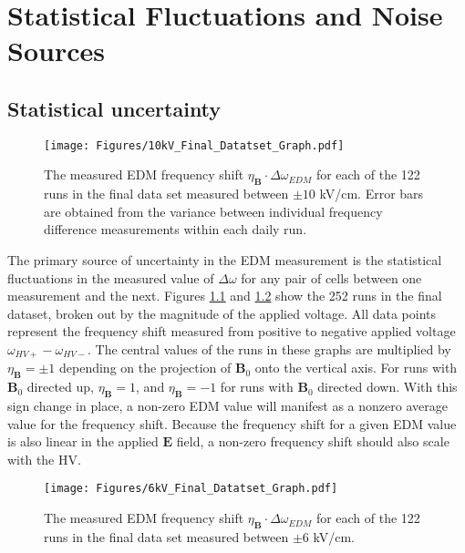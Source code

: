 \documentclass [10pt, twoside] {uwthesis}[2012/04/02]
\begin{document}
\chapter{Statistical Fluctuations and Noise Sources}
\section{Statistical uncertainty}
\begin{figure}[t] \label{10kV_final_result_graph}
\begin{center}
\texttt{[image: Figures/10kV\_Final\_Datatset\_Graph.pdf]}
\end{center}
\caption[Final EDM data set, $\pm$10 kV runs]
{\narrower The measured EDM frequency shift $\eta_{\mathbf{B}}\cdot\Delta \omega_{EDM}$ for each of the 122 runs in the final data set measured between $\pm 10$ kV/cm. Error bars are obtained from the variance between individual frequency difference measurements within each daily run.}
\end{figure} 
The primary source of uncertainty in the EDM measurement is the statistical fluctuations in the measured value of $\Delta\omega$ for any pair of cells between one measurement and the next. Figures \ref{10kV_final_result_graph} and \ref{6kV_final_result_graph} show the 252 runs in the final dataset, broken out by the magnitude of the applied voltage. All data points represent the frequency shift measured from positive to negative applied voltage $\omega_{HV+} - \omega_{HV-}$. The central values of the runs in these graphs are multiplied by $\eta_{\mathbf{B}} = \pm 1$ depending on the projection of $\mathbf{B}_0$ onto the vertical axis. For runs with $\mathbf{B}_0$ directed up, $\eta_{\mathbf{B}} = 1$, and $\eta_{\mathbf{B}} = -1$ for runs with $\mathbf{B}_0$ directed down. With this sign change in place, a non-zero EDM value will manifest as a nonzero average value for the frequency shift. Because the frequency shift for a given EDM value is also linear in the applied $\mathbf{E}$ field, a non-zero frequency shift should also scale with the HV. 

\begin{figure}[t] \label{6kV_final_result_graph}
\begin{center}
\texttt{[image: Figures/6kV\_Final\_Datatset\_Graph.pdf]}
\end{center}
\caption[Final EDM data set, $\pm$6 kV runs]
{\narrower The measured EDM frequency shift $\eta_{\mathbf{B}}\cdot\Delta \omega_{EDM}$ for each of the 122 runs in the final data set measured between $\pm 6$ kV/cm.}
\end{figure}
\end{document}
